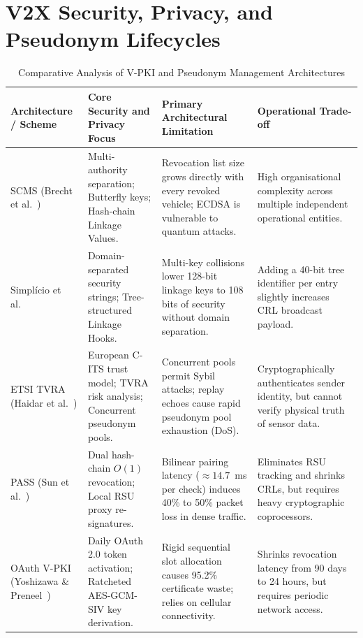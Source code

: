 \section{V2X Security, Privacy, and Pseudonym Lifecycles}
\label{sec:security_privacy}

\begin{table}[!t]
\centering
\caption{Comparative Analysis of V-PKI and Pseudonym Management Architectures}
\label{tab:vpki_comparison}
\begin{tabular}{>{\raggedright\arraybackslash}p{3.2cm}>{\raggedright\arraybackslash}p{4.2cm}>{\raggedright\arraybackslash}p{4.8cm}>{\raggedright\arraybackslash}p{4.0cm}}
\toprule
\textbf{Architecture / Scheme} & \textbf{Core Security and Privacy Focus} & \textbf{Primary Architectural Limitation} & \textbf{Operational Trade-off} \\
\midrule
SCMS (Brecht et al.~\cite{brecht2018scms}) & Multi-authority separation; Butterfly keys; Hash-chain Linkage Values. & Revocation list size grows directly with every revoked vehicle; ECDSA is vulnerable to quantum attacks. & High organisational complexity across multiple independent operational entities. \\
\addlinespace
Simpl\'icio et al.~\cite{simplicio2018privacy} & Domain-separated security strings; Tree-structured Linkage Hooks. & Multi-key collisions lower 128-bit linkage keys to 108 bits of security without domain separation. & Adding a 40-bit tree identifier per entry slightly increases CRL broadcast payload. \\
\addlinespace
ETSI TVRA (Haidar et al.~\cite{haidar2019risk}) & European C-ITS trust model; TVRA risk analysis; Concurrent pseudonym pools. & Concurrent pools permit Sybil attacks; replay echoes cause rapid pseudonym pool exhaustion (DoS). & Cryptographically authenticates sender identity, but cannot verify physical truth of sensor data. \\
\addlinespace
PASS (Sun et al.~\cite{sun2010efficient}) & Dual hash-chain $O(1)$ revocation; Local RSU proxy re-signatures. & Bilinear pairing latency ($\approx 14.7$~ms per check) induces 40\% to 50\% packet loss in dense traffic. & Eliminates RSU tracking and shrinks CRLs, but requires heavy cryptographic coprocessors. \\
\addlinespace
OAuth V-PKI (Yoshizawa \& Preneel~\cite{yoshizawa2023new}) & Daily OAuth 2.0 token activation; Ratcheted AES-GCM-SIV key derivation. & Rigid sequential slot allocation causes 95.2\% certificate waste; relies on cellular connectivity. & Shrinks revocation latency from 90 days to 24 hours, but requires periodic network access. \\
\bottomrule
\end{tabular}
\end{table}

